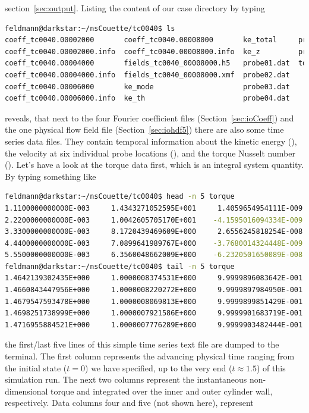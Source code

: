 \documentclass[a4paper, 11pt, DIV=11]{scrartcl}
\begin{document}
section~\ref{sec:output}. Listing the content of our case directory by typing
\begin{lstlisting}[language=bash]
feldmann@darkstar:~/nsCouette/tc0040$ ls
coeff_tc0040.00002000	    coeff_tc0040.00008000	    ke_total     probe05.dat
coeff_tc0040.00002000.info  coeff_tc0040.00008000.info	ke_z	     probe06.dat
coeff_tc0040.00004000	    fields_tc0040_00008000.h5	probe01.dat  torque
coeff_tc0040.00004000.info  fields_tc0040_00008000.xmf	probe02.dat
coeff_tc0040.00006000	    ke_mode			            probe03.dat
coeff_tc0040.00006000.info  ke_th			            probe04.dat
\end{lstlisting}
reveals, that next to the four Fourier coefficient files (Section~\ref{sec:ioCoeff})
and the one physical flow field file (Section~\ref{sec:iohdf5}) there are also some
time series data files. They contain temporal information about the kinetic energy
(), the velocity at six individual probe locations (),
and the torque Nusselt number (). Let's have a look at the torque
data first, which is an integral system quantity. By typing something like
\begin{lstlisting}[language=bash]
feldmann@darkstar:~/nsCouette/tc0040$ head -n 5 torque
1.1100000000000E-003     1.4343271052595E+001     1.4059654954111E-009   ...
2.2200000000000E-003     1.0042605705170E+001    -4.1595016094334E-009   ...
3.3300000000000E-003     8.1720439469609E+000     2.6556245818254E-008   ...
4.4400000000000E-003     7.0899641989767E+000    -3.7680014324448E-009   ...
5.5500000000000E-003     6.3560048662009E+000    -6.2320501650089E-008   ...
feldmann@darkstar:~/nsCouette/tc0040$ tail -n 5 torque
1.4642139302435E+000     1.0000008374531E+000     9.9999896083642E-001   ...
1.4660843447956E+000     1.0000008220272E+000     9.9999897984950E-001   ...
1.4679547593478E+000     1.0000008069813E+000     9.9999899851429E-001   ...
1.4698251738999E+000     1.0000007921586E+000     9.9999901683719E-001   ...
1.4716955884521E+000     1.0000007776289E+000     9.9999903482444E-001   ...
\end{lstlisting}
the first/last five lines of this simple time series text file are dumped to the 
terminal. The first column represents the advancing physical time ranging from
the initial state ($t=0$) we have specified, up to the very end ($t\approx\num{1.5}$)
of this simulation run. The next two columns represent the instantaneous
non-dimensional torque \Nuomi and \Nuomo integrated over the inner and outer
cylinder wall, respectively. Data columns four and five (not shown here), represent
\end{document}
